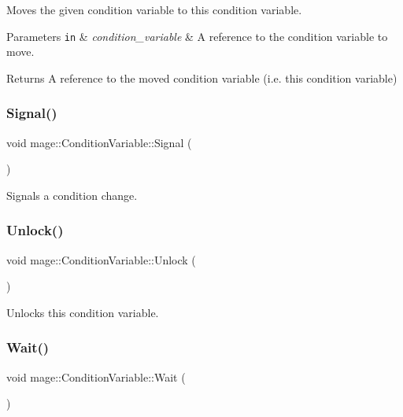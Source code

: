 Moves the given condition variable to this condition variable.


\begin{DoxyParams}[1]{Parameters}
\mbox{\tt in}  & {\em condition\+\_\+variable} & A reference to the condition variable to move. \\
\hline
\end{DoxyParams}
\begin{DoxyReturn}{Returns}
A reference to the moved condition variable (i.\+e. this condition variable) 
\end{DoxyReturn}
\hypertarget{structmage_1_1_condition_variable_a09e52f0d51c10ee565a895d2444175d9}{}\label{structmage_1_1_condition_variable_a09e52f0d51c10ee565a895d2444175d9} 
\subsubsection{\texorpdfstring{Signal()}{Signal()}}
{\footnotesize\ttfamily void mage\+::\+Condition\+Variable\+::\+Signal (\begin{DoxyParamCaption}{ }\end{DoxyParamCaption})}

Signals a condition change. \hypertarget{structmage_1_1_condition_variable_a3b3fe63417b7d7adedc9fe015fc7feea}{}\label{structmage_1_1_condition_variable_a3b3fe63417b7d7adedc9fe015fc7feea} 
\subsubsection{\texorpdfstring{Unlock()}{Unlock()}}
{\footnotesize\ttfamily void mage\+::\+Condition\+Variable\+::\+Unlock (\begin{DoxyParamCaption}{ }\end{DoxyParamCaption})}

Unlocks this condition variable. \hypertarget{structmage_1_1_condition_variable_abc279c54285145d981f409c2d110c85a}{}\label{structmage_1_1_condition_variable_abc279c54285145d981f409c2d110c85a} 
\subsubsection{\texorpdfstring{Wait()}{Wait()}}
{\footnotesize\ttfamily void mage\+::\+Condition\+Variable\+::\+Wait (\begin{DoxyParamCaption}{ }\end{DoxyParamCaption})}


